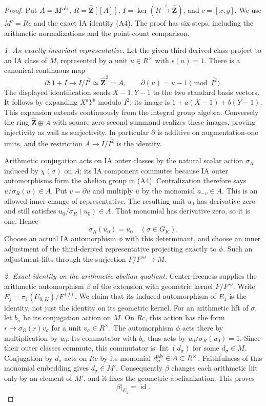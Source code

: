 \begin{proof}
Put $A=M^{\rm ab}$, $R=\widehat{\mathbf Z}[[A]]$,
$I=\ker(R\xrightarrow\epsilon\widehat{\mathbf Z})$,
and $c=[x,y]$. We use $M'=Rc$ and the exact IA identity
(A4). The proof has six steps, including the arithmetic
normalizations and the point-count comparison.

\emph{1. An exactly invariant representative.}
Let the given third-derived class project to an IA class
of $M$, represented by a unit $u\in R^\times$ with
$\epsilon(u)=1$. There is a canonical continuous map
\[
 \partial:1+I\longrightarrow I/\overline{I^2}
       \simeq\widehat{\mathbf Z}^2=A,
       \qquad \partial(u)=u-1\pmod{\overline{I^2}}.
\]
The displayed identification sends $X-1,Y-1$ to the
two standard basis vectors. It follows by expanding
$X^aY^b$ modulo $I^2$: its image is
$1+a(X-1)+b(Y-1)$. This expansion extends continuously
from the integral group algebra. Conversely the ring
$\widehat{\mathbf Z}\oplus A$ with square-zero second
summand realizes these images, proving injectivity as
well as surjectivity. In particular $\partial$ is
additive on augmentation-one units, and the restriction
$A\to I/\overline{I^2}$ is the identity.

Arithmetic conjugation acts on IA outer classes by the
natural scalar action $\sigma_R$ induced by $\chi(\sigma)$
on $A$; its IA component commutes because IA outer
automorphisms form the abelian group in (A4).
Centralization therefore says
$u/\sigma_R(u)\in A$. Put $v=\partial u$ and multiply
$u$ by the monomial $a_{-v}\in A$. This is an allowed
inner change of representative. The resulting unit
$u_0$ has derivative zero and still satisfies
$u_0/\sigma_R(u_0)\in A$. That monomial has derivative
zero, so it is one. Hence
\[
       \sigma_R(u_0)=u_0\quad(\sigma\in G_K).                 \tag{A26}
\]
Choose an actual IA automorphism $\phi$ with this
determinant, and choose an inner adjustment of the
third-derived representative projecting exactly to
$\phi$. Such an adjustment lifts through the surjection
$F/F'''\to M$.

\emph{2. Exact identity on the arithmetic abelian quotient.}
Center-freeness supplies the arithmetic automorphism
$\beta$ of the extension with geometric kernel $F/F'''$.
Write $E_j=\pi_1(U_{0,K})/F^{(j)}$. We claim that its
induced automorphism of $E_1$ is the identity, not just
the identity on its geometric kernel.
For an arithmetic lift of $\sigma$, let $b_\sigma$ be
its conjugation action on $M$. On $Rc$, this action has
the form $r\mapsto\sigma_R(r)v_\sigma$ for a unit
$v_\sigma\in R^\times$. The automorphism $\phi$ acts
there by multiplication by $u_0$. Its commutator with
$b_\sigma$ thus acts by
$u_0/\sigma_R(u_0)=1$.
Since their outer classes commute, this commutator is
$\operatorname{Int}(d_\sigma)$ for some $d_\sigma\in M$.
Conjugation by $d_\sigma$ acts on $Rc$ by its monomial
$d_\sigma^{\rm ab}\in A\subset R^\times$. Faithfulness
of this monomial embedding gives $d_\sigma\in M'$.
Consequently $\beta$ changes each arithmetic lift only
by an element of $M'$, and it fixes the geometric
abelianization. This proves
\[
                         \beta|_{E_1}=\operatorname{id}.
                                                               \tag{A27}
\]


\end{proof}
